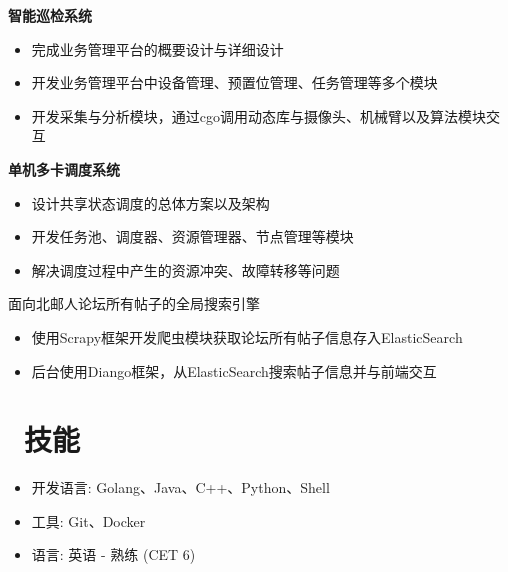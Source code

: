 \documentclass{resume}
\begin{document}
\textbf{智能巡检系统}
\begin{itemize}
  \item 完成业务管理平台的概要设计与详细设计
  \item 开发业务管理平台中设备管理、预置位管理、任务管理等多个模块
  \item 开发采集与分析模块，通过cgo调用动态库与摄像头、机械臂以及算法模块交互
\end{itemize}

\textbf{单机多卡调度系统}
\begin{itemize}
  \item 设计共享状态调度的总体方案以及架构
  \item 开发任务池、调度器、资源管理器、节点管理等模块
  \item 解决调度过程中产生的资源冲突、故障转移等问题
\end{itemize}

\begin{onehalfspacing}
面向北邮人论坛所有帖子的全局搜索引擎
\begin{itemize}
  \item 使用Scrapy框架开发爬虫模块获取论坛所有帖子信息存入ElasticSearch
  \item 后台使用Diango框架，从ElasticSearch搜索帖子信息并与前端交互
\end{itemize}
\end{onehalfspacing}


\section{\faCogs\ 技能}
\begin{itemize}[parsep=0.5ex]
  \item 开发语言: Golang、Java、C++、Python、Shell
  \item 工具: Git、Docker
  \item 语言: 英语 - 熟练 (CET 6)
\end{itemize}
\end{document}
